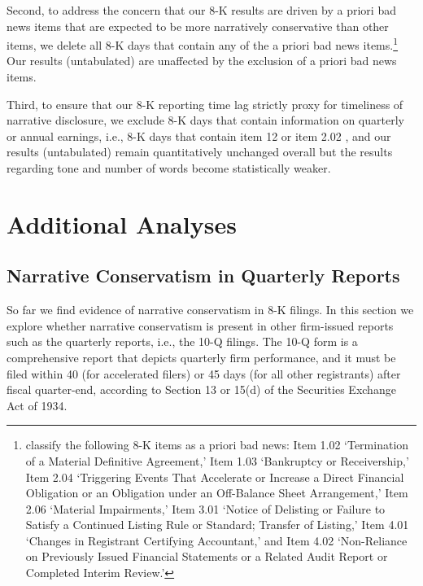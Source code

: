 \documentclass[letterpaper,12pt]{article}
\begin{document}
\begin{spacing}{1.5}

Second, to address the concern that our 8-K results are driven by a priori bad news items that are expected to be more narratively conservative than other items, we delete all 8-K days that contain any of the a priori bad news items.\footnote{ classify the following 8-K items as a priori bad news: Item 1.02 `Termination of a Material Definitive Agreement,' Item 1.03 `Bankruptcy or Receivership,' Item 2.04 `Triggering Events That Accelerate or Increase a Direct Financial Obligation or an Obligation under an Off-Balance Sheet Arrangement,' Item 2.06 `Material Impairments,' Item 3.01 `Notice of Delisting or Failure to Satisfy a Continued Listing Rule or Standard; Transfer of Listing,' Item 4.01 `Changes in Registrant Certifying Accountant,' and Item 4.02 `Non-Reliance on Previously Issued Financial Statements or a Related Audit Report or Completed Interim Review.'} Our results (untabulated) are unaffected by the exclusion of a priori bad news items. 

Third, to ensure that our 8-K reporting time lag strictly proxy for timeliness of narrative disclosure, we exclude 8-K days that contain information on quarterly or annual earnings, i.e., 8-K days that contain item 12 or item 2.02 \cite{segalAreManagersStrategic2016}, and our results (untabulated) remain quantitatively unchanged overall but the results regarding tone and number of words become statistically weaker. 

\section{Additional Analyses}
\subsection{Narrative Conservatism in Quarterly Reports}
\noindent So far we find evidence of narrative conservatism in 8-K filings. In this section we explore whether narrative conservatism is present in other firm-issued reports such as the quarterly reports, i.e., the 10-Q filings. The 10-Q form is a comprehensive report that depicts quarterly firm performance, and it must be filed within 40 (for accelerated filers) or 45 days (for all other registrants) after fiscal quarter-end, according to Section 13 or 15(d) of the Securities Exchange Act of 1934.


\end{spacing}
\end{document}
